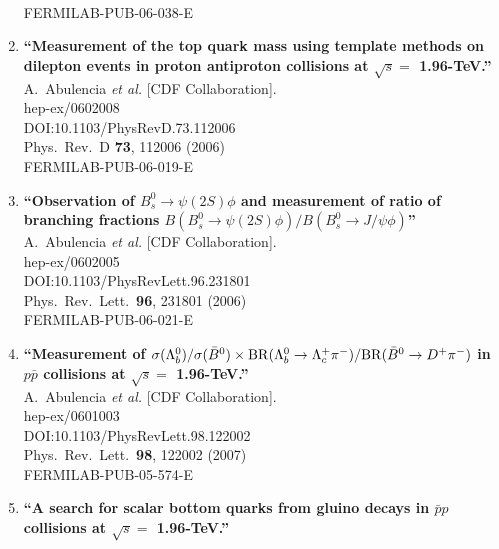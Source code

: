 \documentclass{article}
\begin{document}
\begin{enumerate}
  \\{}FERMILAB-PUB-06-038-E
\item%
{\bf ``Measurement of the top quark mass using template methods on dilepton events in proton antiproton collisions at $\sqrt{s} =$ 1.96-TeV.''}
  \\{}A.~Abulencia {\it et al.} [CDF Collaboration].
  \\{}hep-ex/0602008
  \\{}DOI:10.1103/PhysRevD.73.112006
  \\{}Phys.\ Rev.\ D {\bf 73}, 112006 (2006)
  \\{}FERMILAB-PUB-06-019-E
\item%
{\bf ``Observation of $B_s^0 \to \psi(2S) \phi$ and measurement of ratio of branching fractions $B(B_s^0 \to \psi(2S) \phi)/B(B_s^0 \to J/\psi \phi)$''}
  \\{}A.~Abulencia {\it et al.} [CDF Collaboration].
  \\{}hep-ex/0602005
  \\{}DOI:10.1103/PhysRevLett.96.231801
  \\{}Phys.\ Rev.\ Lett.\  {\bf 96}, 231801 (2006)
  \\{}FERMILAB-PUB-06-021-E
\item%
{\bf ``Measurement of $\sigma(\Lambda_b^0)/\sigma(\bar{B}^0) \times {\rm BR}(\Lambda_b^0 \to \Lambda_c^+ \pi^-)/{\rm BR}(\bar{B}^0 \to D^+ \pi^-)$ in $p\bar{p}$ collisions at $\sqrt{s} =$ 1.96-TeV.''}
  \\{}A.~Abulencia {\it et al.} [CDF Collaboration].
  \\{}hep-ex/0601003
  \\{}DOI:10.1103/PhysRevLett.98.122002
  \\{}Phys.\ Rev.\ Lett.\  {\bf 98}, 122002 (2007)
  \\{}FERMILAB-PUB-05-574-E
\item%
{\bf ``A search for scalar bottom quarks from gluino decays in $\bar{p}p$ collisions at $\sqrt{s} =$ 1.96-TeV.''}

\end{enumerate}
\end{document}
